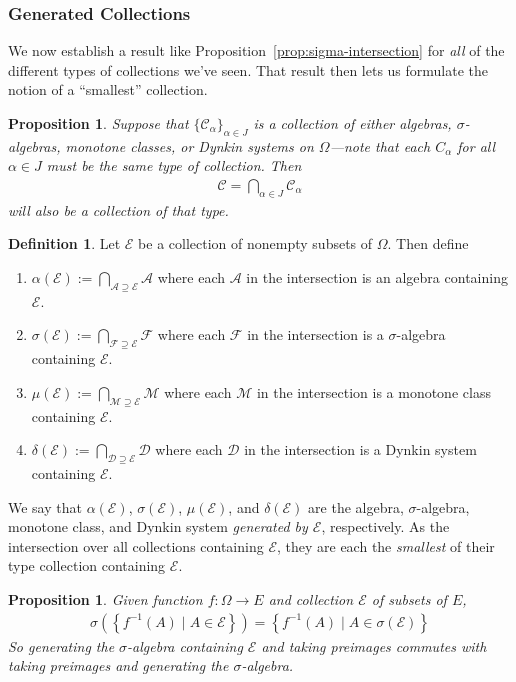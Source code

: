 \documentclass[12pt]{article}
\theoremstyle{plain}
\newtheorem{prop}[thm]{Proposition}
\theoremstyle{definition}
\newtheorem{defn}[thm]{Definition}
\theoremstyle{remark}
\newcommand{\ra}{\rightarrow}
\newcommand{\sE}{\mathscr{E}}
\newcommand{\sF}{\mathscr{F}}
\newcommand{\sC}{\mathscr{C}}
\newcommand{\sD}{\mathscr{D}}
\newcommand{\sM}{\mathscr{M}}
\newcommand{\sA}{\mathscr{A}}
\newcommand{\calE}{\mathcal{E}}
\begin{document}
\subsubsection{Generated Collections}

We now establish a result like Proposition~\ref{prop:sigma-intersection}
for \emph{all} of the different types of collections we've seen. That
result then lets us formulate the notion of a ``smallest'' collection.

\begin{prop}
Suppose that $\{\sC_\alpha\}_{\alpha \in J}$ is a collection of either
algebras, $\sigma$-algebras, monotone classes,
or Dynkin systems on $\Omega$---note that each $C_\alpha$ for all
$\alpha\in J$ must be the same type of collection. Then
\begin{align*}
  \sC = \bigcap_{\alpha \in J} \sC_\alpha
\end{align*}
will also be a collection of that type.
\end{prop}

\begin{defn}
Let $\sE$ be a collection of nonempty subsets of $\Omega$. Then
define
\begin{enumerate}
  \item $\alpha(\sE) := \bigcap_{\sA \supseteq \sE} \sA$ where each
    $\sA$ in the intersection is an algebra containing $\sE$.
  \item $\sigma(\sE) := \bigcap_{\sF \supseteq \sE} \sF$
    where each $\sF$ in the intersection is a $\sigma$-algebra
    containing $\sE$.
  \item $\mu(\sE) := \bigcap_{\sM \supseteq \sE} \sM$
    where each $\sM$ in the intersection is a monotone class containing
    $\sE$.
  \item $\delta(\sE) := \bigcap_{\sD \supseteq \sE} \sD$
    where each $\sD$ in the intersection is a Dynkin system containing
    $\sE$.
\end{enumerate}
We say that $\alpha(\sE)$, $\sigma(\sE)$, $\mu(\sE)$, and $\delta(\sE)$ are the
algebra, $\sigma$-algebra, monotone class, and Dynkin system
\emph{generated by $\sE$}, respectively. As the intersection over all
collections containing $\sE$, they are each the \emph{smallest}
of their type collection containing $\sE$.
\end{defn}

\begin{prop}
Given function $f:\Omega\ra E$ and collection $\calE$ of subsets of $E$,
\begin{align*}
  \sigma\left( \left\{ f^{-1}(A) \;|\; A\in\calE \right\} \right)
  =
  \left\{ f^{-1}(A) \;|\; A\in\sigma\left( \calE \right)\right\}
\end{align*}
So generating the $\sigma$-algebra containing $\calE$ and taking
preimages \emph{commutes} with taking preimages and generating the
$\sigma$-algebra.
\end{prop}
\end{document}
